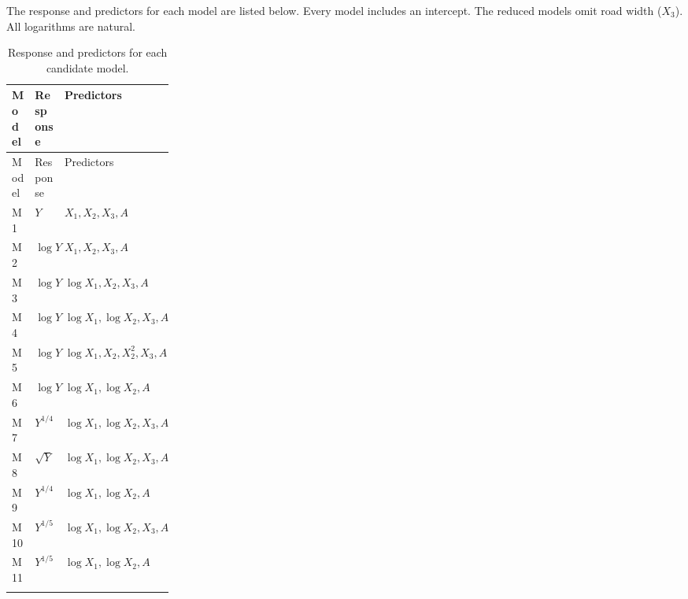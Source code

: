 \documentclass[11pt,a4paper]{article}
\begin{document}
The response and predictors for each model are listed below. Every model includes
an intercept. The reduced models omit road width ($X_3$). All logarithms are natural.

\begingroup\small
\begin{longtable}{@{}p{0.08\linewidth}p{0.16\linewidth}p{}@{}}
\toprule Model & Response & Predictors\\ \midrule
\endfirsthead
\toprule Model & Response & Predictors\\ \midrule
\endhead
M1 & $Y$ & $X_1, X_2, X_3, A$\\
M2 & $\log Y$ & $X_1, X_2, X_3, A$\\
M3 & $\log Y$ & $\log X_1, X_2, X_3, A$\\
M4 & $\log Y$ & $\log X_1, \log X_2, X_3, A$\\
M5 & $\log Y$ & $\log X_1, X_2, X_2^2, X_3, A$\\
M6 & $\log Y$ & $\log X_1, \log X_2, A$\\
M7 & $Y^{1/4}$ & $\log X_1, \log X_2, X_3, A$\\
M8 & $\sqrt{Y}$ & $\log X_1, \log X_2, X_3, A$\\
M9 & $Y^{1/4}$ & $\log X_1, \log X_2, A$\\
M10 & $Y^{1/5}$ & $\log X_1, \log X_2, X_3, A$\\
M11 & $Y^{1/5}$ & $\log X_1, \log X_2, A$\\
\bottomrule
\caption{Response and predictors for each candidate model.}\\
\end{longtable}
\endgroup
\end{document}
